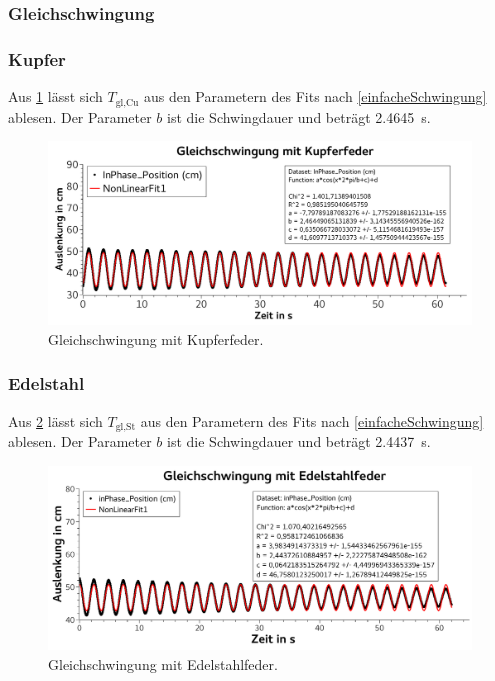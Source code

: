 \documentclass[
	a4paper,
	12pt,
	pagesize,
	ngerman
]{scrartcl}
\begin{document}
	\subsubsection{Gleichschwingung}

	\subsubsection*{Kupfer}
	Aus \cref{KupferGleichschwingung} lässt sich $T_\text{gl,Cu}$ aus den Parametern des Fits nach \cref{einfacheSchwingung} ablesen. Der Parameter $b$ ist die Schwingdauer und beträgt \SI{2,4645}{s}.
	\begin{figure}[H]
		\includegraphics[width=1\textwidth]{KupferGleichschwingung}
		\centering
		\caption{Gleichschwingung mit Kupferfeder.}
		\label{KupferGleichschwingung}
		\centering
	\end{figure}

	\subsubsection*{Edelstahl}
	Aus \cref{EdelstahlGleichschwingung} lässt sich $T_\text{gl,St}$ aus den Parametern des Fits nach \cref{einfacheSchwingung} ablesen. Der Parameter $b$ ist die Schwingdauer und beträgt \SI{2,4437}{s}.
	\begin{figure}[H]
		\includegraphics[width=1\textwidth]{EdelstahlGleichschwingung}
		\centering
		\caption{Gleichschwingung mit Edelstahlfeder.}
		\label{EdelstahlGleichschwingung}
		\centering
	\end{figure}
\end{document}
